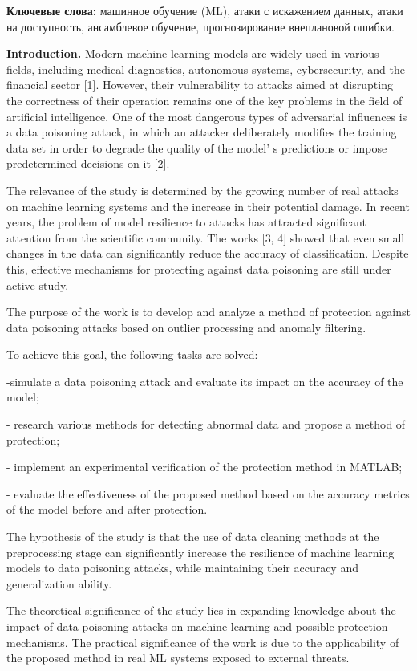 {\bfseries Ключевые слова:} машинное обучение (ML), атаки с искажением
данных, атаки на доступность, ансамблевое обучение, прогнозирование
внеплановой ошибки.

\begin{multicols}{2}
{\bfseries Introduction.} Modern machine learning models are widely used in
various fields, including medical diagnostics, autonomous systems,
cybersecurity, and the financial sector {[}1{]}. However, their
vulnerability to attacks aimed at disrupting the correctness of their
operation remains one of the key problems in the field of artificial
intelligence. One of the most dangerous types of adversarial influences
is a data poisoning attack, in which an attacker deliberately modifies
the training data set in order to degrade the quality of the
model' s predictions or impose predetermined decisions on
it {[}2{]}.

The relevance of the study is determined by the growing number of real
attacks on machine learning systems and the increase in their potential
damage. In recent years, the problem of model resilience to attacks has
attracted significant attention from the scientific community. The works
{[}3, 4{]} showed that even small changes in the data can significantly
reduce the accuracy of classification. Despite this, effective
mechanisms for protecting against data poisoning are still under active
study.

The purpose of the work is to develop and analyze a method of protection
against data poisoning attacks based on outlier processing and anomaly
filtering.

To achieve this goal, the following tasks are solved:

-simulate a data poisoning attack and evaluate its impact on the
accuracy of the model;

- research various methods for detecting abnormal data and propose a
method of protection;

- implement an experimental verification of the protection method in
MATLAB;

- evaluate the effectiveness of the proposed method based on the
accuracy metrics of the model before and after protection.

The hypothesis of the study is that the use of data cleaning methods at
the preprocessing stage can significantly increase the resilience of
machine learning models to data poisoning attacks, while maintaining
their accuracy and generalization ability.

The theoretical significance of the study lies in expanding knowledge
about the impact of data poisoning attacks on machine learning and
possible protection mechanisms. The practical significance of the work
is due to the applicability of the proposed method in real ML systems
exposed to external threats.


\end{multicols}
